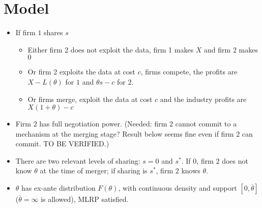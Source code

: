 \documentclass[a4paper]{article}
\renewcommand{\t}{\theta}
\begin{document}
\section{Model}
\begin{itemize}
  \item If firm $1$ shares $s$ 
  \begin{itemize}
      \item Either firm 2 does not exploit the data, firm 1 makes $X$ and firm 2 makes $0$
      \item Or firm 2 exploits the data at cost $c$, firms compete, the profits are $X-L(\t)$ for $1$ and $\t s-c$ for $2$.
      \item Or firms merge, exploit the data at cost $c$ and the industry profits are $X(1+\t)-c$
  \end{itemize}
  \item Firm $2$ has full negotiation power. (Needed: firm $2$ cannot commit to a mechanism at the merging stage? Result below seems fine even if firm $2$ can commit. TO BE VERIFIED.) 
  \item There are two relevant levels of sharing: $s=0$ and $s^*$. If $0$, firm $2$ does not know $\t$ at the time of merger; if sharing is $s^*$, firm $2$ knows $\t$.
  \item $\t$ has ex-ante distribution $F(\t)$, with continuous density and support $[0,\overline \t]$ ($\overline \t=\infty$ is allowed), MLRP satisfied.
\end{itemize}
\end{document}
